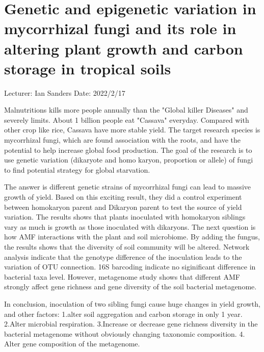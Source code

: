 \documentclass[11pt]{article}
\begin{document}
\newpage





\section{Genetic and epigenetic variation in mycorrhizal fungi and its role in altering plant growth and carbon storage in tropical soils}
Lecturer: Ian Sanders
\newline
Date: 2022/2/17
\newline


Malnutritions kills more people annually than the "Global killer Diseases" and severely limits. About 1 billion people eat "Cassava" everyday. Compared with other crop like rice, Cassava have more stable yield. The target research species is mycorrhizal fungi, which are found association with the roots, and have the potential to help increase global food production. The goal of the research is to use genetic variation (dikaryote and homo karyon, proportion or allele) of fungi to find potential strategy for global starvation.

The answer is different genetic strains of mycorrhizal fungi can lead to massive growth of yield. Based on this exciting result, they did a control experiment between homokaryon parent and Dikaryon parent to test the source of yield variation. The results shows that plants inoculated with homokaryon siblings vary as much is growth as those inoculated with dikaryons. The next question is how AMF interactions with the plant and soil microbiome. By adding the fungus, the results shows that the diversity of soil community will be altered. Network analysis indicate that the genotype difference of the inoculation leads to the variation of OTU connection. 16S barcoding indicate no siginificant difference in bacterial taxa level. However, metagenome study shows that different AMF strongly affect gene richness and gene diversity of the soil bacterial metagenome.

In conclusion, inoculation of two sibling fungi cause huge changes in yield growth, and other factors:
1.alter soil aggregation and carbon storage in only 1 year. 2.Alter microbial respiration. 3.Increase or decrease gene richness diversity in the bacterial metagenome without obviously changing taxonomic composition. 4. Alter gene composition of the metagenome.






\newpage
\end{document}
